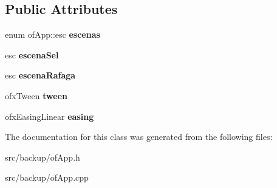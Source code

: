 \subsection*{Public Attributes}
\begin{DoxyCompactItemize}
\item 
\hypertarget{classof_app_ae769e8719339a6d9bea08d27471eec2c}{}enum of\+App\+::esc {\bfseries escenas}\label{classof_app_ae769e8719339a6d9bea08d27471eec2c}

\item 
\hypertarget{classof_app_a276986bf8ca05cc08ed99fa2c7a3aade}{}esc {\bfseries escena\+Sel}\label{classof_app_a276986bf8ca05cc08ed99fa2c7a3aade}

\item 
\hypertarget{classof_app_a28533eed35e42c643103cffe6947ee20}{}esc {\bfseries escena\+Rafaga}\label{classof_app_a28533eed35e42c643103cffe6947ee20}

\item 
\hypertarget{classof_app_a73dce5457705c30e2f46f3084dfcd9b7}{}ofx\+Tween {\bfseries tween}\label{classof_app_a73dce5457705c30e2f46f3084dfcd9b7}

\item 
\hypertarget{classof_app_a10b99ac9ad5f1219ff3076cbe560eb91}{}ofx\+Easing\+Linear {\bfseries easing}\label{classof_app_a10b99ac9ad5f1219ff3076cbe560eb91}

\end{DoxyCompactItemize}


The documentation for this class was generated from the following files\+:\begin{DoxyCompactItemize}
\item 
src/backup/of\+App.\+h\item 
src/backup/of\+App.\+cpp\end{DoxyCompactItemize}
